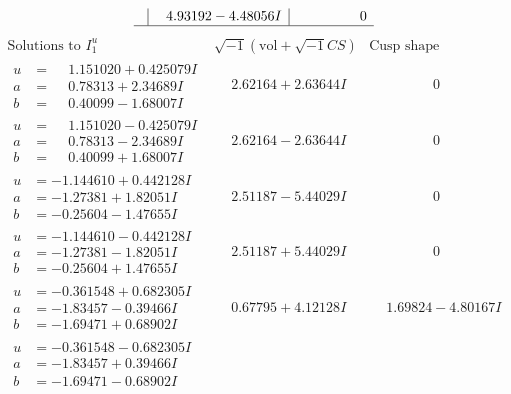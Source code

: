 \documentclass[1p]{elsarticle_modified}
\theoremstyle{definition}
\newcommand{\I}{\sqrt{-1}}
\begin{document}
$$\begin{array}{c|c|c}
 & \phantom{-}4.93192 - 4.48056 I & \phantom{-0.000000 } 0\\
 \hline 
 \end{array}$$\newpage$$\begin{array}{c|c|c}  
\text{Solutions to }I^u_{1}& \I (\text{vol} + \sqrt{-1}CS) & \text{Cusp shape}\\
 \hline 
\begin{aligned}
u &= \phantom{-}1.151020 + 0.425079 I \\
a &= \phantom{-}0.78313 + 2.34689 I \\
b &= \phantom{-}0.40099 - 1.68007 I\end{aligned}
 & \phantom{-}2.62164 + 2.63644 I & \phantom{-0.000000 } 0 \\ \hline\begin{aligned}
u &= \phantom{-}1.151020 - 0.425079 I \\
a &= \phantom{-}0.78313 - 2.34689 I \\
b &= \phantom{-}0.40099 + 1.68007 I\end{aligned}
 & \phantom{-}2.62164 - 2.63644 I & \phantom{-0.000000 } 0 \\ \hline\begin{aligned}
u &= -1.144610 + 0.442128 I \\
a &= -1.27381 + 1.82051 I \\
b &= -0.25604 - 1.47655 I\end{aligned}
 & \phantom{-}2.51187 - 5.44029 I & \phantom{-0.000000 } 0 \\ \hline\begin{aligned}
u &= -1.144610 - 0.442128 I \\
a &= -1.27381 - 1.82051 I \\
b &= -0.25604 + 1.47655 I\end{aligned}
 & \phantom{-}2.51187 + 5.44029 I & \phantom{-0.000000 } 0 \\ \hline\begin{aligned}
u &= -0.361548 + 0.682305 I \\
a &= -1.83457 - 0.39466 I \\
b &= -1.69471 + 0.68902 I\end{aligned}
 & \phantom{-}0.67795 + 4.12128 I & \phantom{-}1.69824 - 4.80167 I \\ \hline\begin{aligned}
u &= -0.361548 - 0.682305 I \\
a &= -1.83457 + 0.39466 I \\
b &= -1.69471 - 0.68902 I\end{aligned}

\end{array}$$
\end{document}
